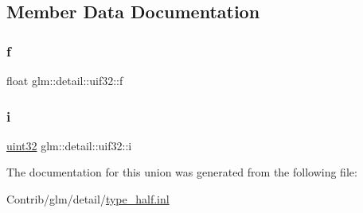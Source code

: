 \subsection{Member Data Documentation}
\mbox{\label{unionglm_1_1detail_1_1uif32_a5f697f84c5a8ec72c2f3a4f705f5bde8}} 
\subsubsection{\texorpdfstring{f}{f}}
{\footnotesize\ttfamily float glm\+::detail\+::uif32\+::f}

\mbox{\label{unionglm_1_1detail_1_1uif32_a981c1c59e160db23c73908cd7e629229}} 
\subsubsection{\texorpdfstring{i}{i}}
{\footnotesize\ttfamily \mbox{\hyperlink{namespaceglm_1_1detail_ade6cfbf377022aaa391af8cd50489222}{uint32}} glm\+::detail\+::uif32\+::i}



The documentation for this union was generated from the following file\+:\begin{DoxyCompactItemize}
\item 
Contrib/glm/detail/\mbox{\hyperlink{type__half_8inl}{type\+\_\+half.\+inl}}\end{DoxyCompactItemize}
